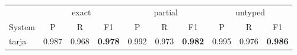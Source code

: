 \begin{tabular}{lccccccccc}
\toprule
 & \multicolumn{3}{c}{exact} & \multicolumn{3}{c}{partial} & \multicolumn{3}{c}{untyped} \\
System & P & R & F1 & P & R & F1 & P & R & F1 \\
\midrule
tarja & 0.987 & 0.968 & \textbf{0.978} & 0.992 & 0.973 & \textbf{0.982} & 0.995 & 0.976 & \textbf{0.986} \\
\bottomrule
\end{tabular}
